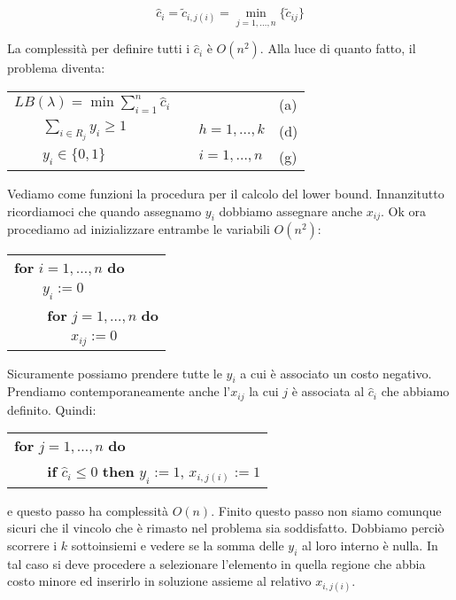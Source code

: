 \documentclass[11pt]{book}
\begin{document}
$$
\hat{c}_i = \tilde{c}_{i,j(i)} = \min_{j=1,\dots,n} \{ \tilde{c}_{ij}\}
$$

La complessit\`a per definire tutti i $\hat{c}_i$ \`e $O(n^2)$. Alla
luce di quanto fatto, il problema diventa:

\begin{center}
\begin{tabular}{lp{2cm}ll}
  $LB(\lambda) = \min \sum\limits_{i=1}^n \hat{c}_{i}$ & & & (a)\\
  $\qquad \sum\limits_{i \in R_j} y_i \geq 1$ & & $h = 1,\dots,k$ &
  (d) \\
  $\qquad y_{i} \in\{0,1\}$ & & $i = 1,\dots,n$ & (g) \\
\end{tabular}
\end{center}

Vediamo come funzioni la procedura per il calcolo del lower
bound. In\-nan\-zi\-tut\-to ricordiamoci che quando assegnamo $y_i$
dobbiamo assegnare anche $x_{ij}$. Ok ora procediamo ad inizializzare
entrambe le variabili $O(n^2)$:

\vspace{15pt}
  \begin{tabular}{l}
    \textbf{for} $i=1,\dots,n$ \textbf{do}\\
    $\qquad y_i := 0$\\
    $\qquad$ \textbf{for} $j=1,\dots,n$ \textbf{do}\\
    $\qquad\qquad x_{ij} := 0$
  \end{tabular}
\vspace{15pt}

Sicuramente possiamo prendere tutte le $y_i$ a cui \`e associato un
costo negativo. Prendiamo contemporaneamente anche l'$x_{ij}$ la cui
$j$ \`e associata al $\hat{c}_i$ che abbiamo definito. Quindi:

\vspace{15pt}
\begin{tabular}{l}
  \textbf{for} $j=1,\dots,n$ \textbf{do}\\
  $\qquad$ \textbf{if} $\hat{c}_i \leq 0$ \textbf{then} $y_i:=1$, $x_{i,j(i)}:=1$
\end{tabular}
\vspace{15pt}

e questo passo ha complessit\`a $O(n)$. Finito questo passo non siamo
comunque sicuri che il vincolo che \`e rimasto nel problema sia
soddisfatto. Dobbiamo perci\`o scorrere i $k$ sottoinsiemi e vedere se
la somma delle $y_i$ al loro interno \`e nulla. In tal caso si deve
procedere a selezionare l'elemento in quella regione che abbia costo
minore ed inserirlo in soluzione assieme al relativo $x_{i,j(i)}$.
\end{document}
